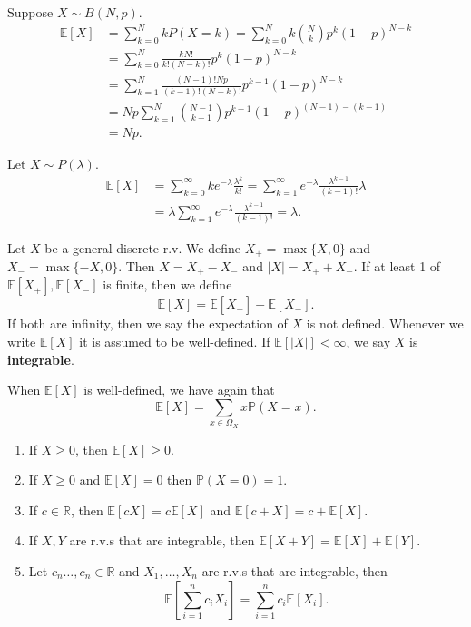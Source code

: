 \begin{example}
    Suppose $ X\sim B(N,p) $.
    \begin{align*}
        \mathbb{E}[X]&= \sum_{k=0}^{N} kP(X=k)=\sum_{k=0}^{N}k \binom{N}{k}p^k (1-p)^{N-k}\\ 
        &= \sum_{k=0}^{N}\frac{kN!}{k!(N-k)!}p^k (1-p)^{N-k}\\ 
        &= \sum_{k=1}^{N} \frac{(N-1)!Np}{(k-1)!(N-k)!}p^{k-1}(1-p)^{N-k}\\ 
        &= Np \sum_{k=1}^{N} \binom{N-1}{k-1}p^{k-1}(1-p)^{(N-1)-(k-1)}\\ 
        &= Np.
    \end{align*}
\end{example}

\begin{example}
    Let $ X\sim P(\lambda) $.
    \begin{align*}
        \mathbb{E}[X]&=\sum_{k=0}^{\infty} k e^{-\lambda} \frac{\lambda^k}{k!} = \sum_{k=1}^{\infty} e^{-\lambda}\frac{\lambda^{k-1}}{(k-1)!}\lambda\\
        &= \lambda \sum_{k=1}^{\infty} e^{-\lambda}\frac{\lambda^{k-1}}{(k-1)!} = \lambda.
    \end{align*}
\end{example}

\begin{definition}
    Let $X$ be a general discrete r.v. We define $ X_+=\max \{X,0\} $ and $ X_-=\max \{-X,0\} $. Then $X=X_+-X_-$ and $ |X|=X_++X_- $. If at least 1 of $ \mathbb{E}[X_+],\mathbb{E}[X_-] $ is finite, then we define 
    \[
        \mathbb{E}[X] = \mathbb{E}[X_+]-\mathbb{E}[X_-].
    \]
    If both are infinity, then we say the expectation of $X$ is not defined. Whenever we write $ \mathbb{E}[X] $ it is assumed to be well-defined. If $ \mathbb{E}[|X|]<\infty  $, we say $X$ is \textbf{integrable}.
\end{definition}
When $ \mathbb{E}[X] $ is well-defined, we have again that 
\[
    \mathbb{E}[X] = \sum_{x\in \Omega_X}x \mathbb{P}(X=x).
\]

\begin{proposition}\label{prop:properties of expectation}
    \begin{enumerate}
        \item If $ X\ge 0 $, then $ \mathbb{E}[X]\ge 0 $.
        \item If $X\ge 0 $ and $ \mathbb{E}[X]=0 $ then $ \mathbb{P}(X=0)=1$.
        \item If $ c\in \mathbb{R} $, then $ \mathbb{E}[cX]=c\mathbb{E}[X] $ and $ \mathbb{E}[c+X]=c+\mathbb{E}[X] $.
        \item If $ X,Y $ are r.v.s that are integrable, then $ \mathbb{E}[X+Y]=\mathbb{E}[X]+\mathbb{E}[Y] $.
        \item Let $ c_n\dots,c_n\in \mathbb{R}  $ and $ X_1,\dots,X_n $ are r.v.s that are integrable, then 
        \[
            \mathbb{E}\left[ \sum_{i=1}^{n}c_iX_i \right] = \sum_{i=1}^{n} c_i\mathbb{E}[X_i].
        \]
    \end{enumerate}
\end{proposition}

